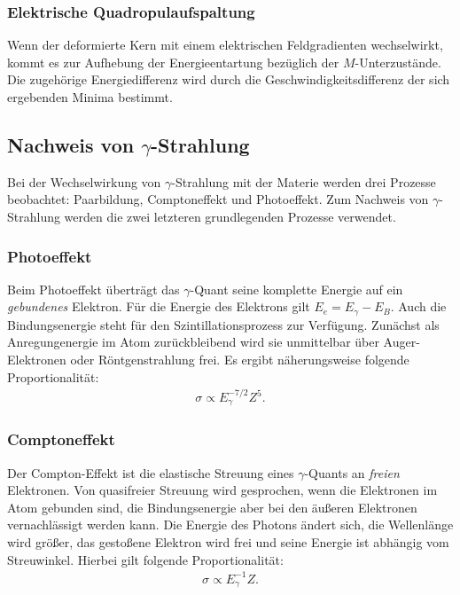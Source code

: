 \documentclass[a4paper,twoside,final]{article}
\begin{document}
\subsubsection{Elektrische Quadropulaufspaltung}
Wenn der deformierte Kern mit einem elektrischen Feldgradienten wechselwirkt, kommt es zur Aufhebung der Energieentartung bezüglich der $M$-Unterzustände. Die zugehörige Energiedifferenz wird durch die Geschwindigkeitsdifferenz der sich ergebenden Minima bestimmt.

\subsection{Nachweis von $\gamma$-Strahlung}
Bei der Wechselwirkung von $\gamma$-Strahlung mit der Materie werden drei Prozesse beobachtet: Paarbildung, Comptoneffekt und Photoeffekt. Zum Nachweis von $\gamma$-Strahlung werden die zwei letzteren grundlegenden Prozesse verwendet.
\subsubsection{Photoeffekt}
Beim Photoeffekt überträgt das $\gamma$-Quant seine komplette Energie auf ein \textit{gebundenes} Elektron. Für die Energie des Elektrons gilt $E_e = E_\gamma - E_B$. Auch die Bindungsenergie steht für den Szintillationsprozess zur Verfügung. Zunächst als Anregungenergie im Atom zurückbleibend wird sie unmittelbar über Auger-Elektronen oder Röntgenstrahlung frei. Es ergibt näherungsweise folgende Proportionalität:
\begin{align}
\sigma  \propto E_{\gamma} ^{-7/2} Z^5.
\end{align}
\subsubsection{Comptoneffekt}
Der Compton-Effekt ist die elastische Streuung eines $\gamma$-Quants an \textit{freien} Elektronen. Von quasifreier Streuung wird gesprochen, wenn die Elektronen im Atom gebunden sind, die Bindungsenergie aber bei den äußeren Elektronen vernachlässigt werden kann. Die Energie des Photons ändert sich, die Wellenlänge wird größer, das gestoßene Elektron wird frei und seine Energie ist abhängig vom Streuwinkel. Hierbei gilt folgende Proportionalität:
\begin{align}
\sigma \propto E_{\gamma}^{-1} Z.
\end{align}
\end{document}

